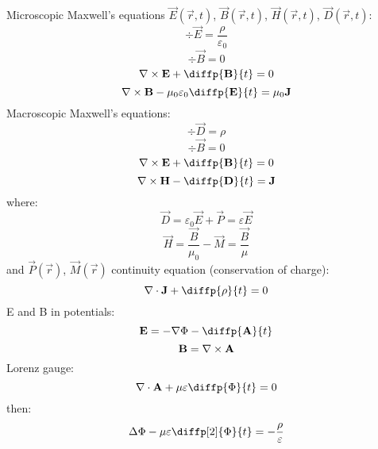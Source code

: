 Microscopic Maxwell's equations $ \vec{E}\left( \vec{r}, t \right) $, $ \vec{B}\left( \vec{r}, t \right) $, $ \vec{H}\left( \vec{r}, t \right) $, $ \vec{D}\left( \vec{r}, t \right) $:
\begin{equation}
\div{\vec{E}} = \frac{\rho}{\varepsilon_0}
\end{equation}
\begin{equation}
\div{\vec{B}} = 0
\end{equation}
\begin{equation}
\rot{\vec{E}} + \diffp{\vec{B}}{t} = 0
\end{equation}
\begin{equation}
\rot{\vec{B}} - \mu_0 \varepsilon_0 \diffp{\vec{E}}{t}= \mu_0 \vec{J}
\end{equation}
Macroscopic Maxwell's equations:
\begin{equation}
\div{\vec{D}} = \rho
\end{equation}
\begin{equation}
\div{\vec{B}} = 0
\end{equation}
\begin{equation}
\rot{\vec{E}} + \diffp{\vec{B}}{t} = 0
\end{equation}
\begin{equation}
\rot{\vec{H}} - \diffp{\vec{D}}{t} = \vec{J}
\end{equation}
where:
\begin{equation}
\vec{D} = \varepsilon_0 \vec{E} + \vec{P} = \varepsilon \vec{E}
\end{equation}
\begin{equation}
\vec{H} = \frac{\vec{B}}{\mu_0} - \vec{M} = \frac{\vec{B}}{\mu} 
\end{equation}
and $ \vec{P}\left(\vec{r} \right) $, $ \vec{M}\left( \vec{r} \right) $
continuity equation (conservation of charge):
\begin{equation}
\div{\vec{J}} + \diffp{\rho}{t} = 0
\end{equation}
E and B in potentials:
\begin{equation}
\vec{E} = -\grad{\Phi} - \diffp{\vec{A}}{t}
\end{equation}
\begin{equation}
\mathbf{B} = \nabla \times \mathbf{A}
\end{equation}
Lorenz gauge:
\begin{equation}
\div{\vec{A}} + \mu \varepsilon \diffp{\Phi}{t} = 0
\end{equation}
then:
\begin{equation}
\laplace{\Phi} - \mu \varepsilon \diffp[2]{\Phi}{t} = -\frac{\rho}{\varepsilon}
\end{equation}
